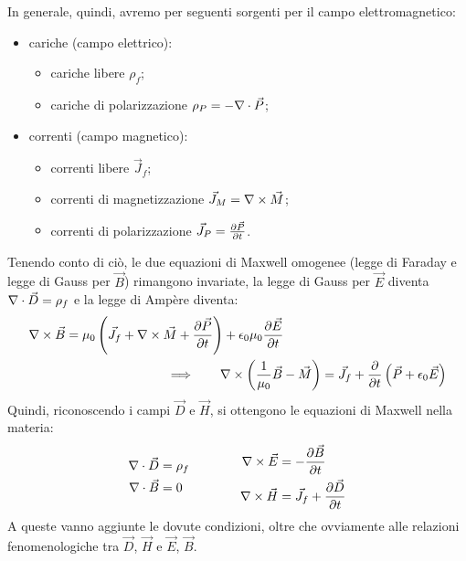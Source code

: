 \documentclass[]{article}
\begin{document}
In generale, quindi, avremo per seguenti sorgenti per il campo elettromagnetico:
\begin{itemize}
	\item cariche (campo elettrico):
	\begin{itemize}
		\item cariche libere $ \rho_f $;
		\item cariche di polarizzazione $ \rho_P = -\nabla\cdot\vec{P} $;
	\end{itemize}
	\item correnti (campo magnetico):
	\begin{itemize}
		\item correnti libere $ \vec{J}_f $;
		\item correnti di magnetizzazione $ \vec{J}_M = \nabla\times\vec{M} $;
		\item correnti di polarizzazione $ \vec{J}_P = \frac{\partial\vec{P}}{\partial t} $.
	\end{itemize}
\end{itemize}
Tenendo conto di ciò, le due equazioni di Maxwell omogenee (legge di Faraday e legge di Gauss per $ \vec{B} $) rimangono invariate, la legge di Gauss per $ \vec{E} $ diventa $ \nabla\cdot\vec{D} = \rho_f $ e la legge di Ampère diventa:
\begin{equation}
	\begin{split}
		\nabla\times\vec{B} &= \mu_0 \left( \vec{J}_f + \nabla\times\vec{M} + \frac{\partial\vec{P}}{\partial t} \right) + \epsilon_0 \mu_0 \frac{\partial\vec{E}}{\partial t} \\ 
			    &\qquad\qquad\qquad\qquad\Longrightarrow\qquad \nabla\times\left(\frac{1}{\mu_0} \vec{B} - \vec{M}\right) = \vec{J}_f + \frac{\partial}{\partial t} \left(\vec{P} + \epsilon_0 \vec{E}\right)
	\end{split}
	\label{eq:5}
\end{equation}
Quindi, riconoscendo i campi $ \vec{D} $ e $ \vec{H} $, si ottengono le equazioni di Maxwell nella materia:
\begin{equation}
	\begin{split}
		\nabla\cdot\vec{D} &= \rho_f \\ 
		\nabla\cdot\vec{B} &= 0 
	\end{split}
	\qquad\qquad
	\begin{split}
		\nabla\times\vec{E} &= - \frac{\partial\vec{B}}{\partial t} \\ 
		\nabla\times\vec{H} &= \vec{J}_f + \frac{\partial\vec{D}}{\partial t}
	\end{split}
	\label{eq:6}
\end{equation}
A queste vanno aggiunte le dovute condizioni, oltre che ovviamente alle relazioni fenomenologiche tra $ \vec{D} $, $ \vec{H} $ e $ \vec{E} $, $	\vec{B} $. \\ 
\end{document}

